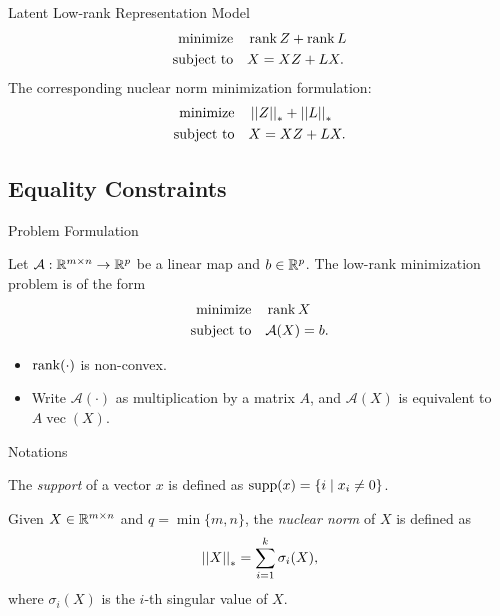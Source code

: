 \documentclass{beamer}
\begin{document}
\begin{frame}{Latent Low-rank Representation Model}
    \[\begin{aligned}
        \textnormal{minimize}\quad & \operatorname{rank} Z+\operatorname{rank} L\\
        \textnormal{subject to}\quad & X=XZ+LX.
    \end{aligned}\]
    \pause
    The corresponding nuclear norm minimization formulation:
    \[\begin{aligned}
        \textnormal{minimize}\quad & \left|\left|Z\right|\right|_\ast+\left|\left|L\right|\right|_\ast\\
        \textnormal{subject to}\quad & X=XZ+LX.
    \end{aligned}\]
\end{frame}

\subsection{Equality Constraints}

\begin{frame}{Problem Formulation}
    \begin{definition}
        Let \(\mathcal A:\mathbb R^{m\times n}\to\mathbb R^p\) be a linear map and \(b\in\mathbb R^p\). The low-rank minimization problem is of the form
        \[\begin{aligned}
            \textnormal{minimize}\quad & \operatorname{rank} X\\
            \textnormal{subject to}\quad & \mathcal A(X)=b.
        \end{aligned}\]
    \end{definition}
    \pause
    \begin{itemize}
        \item \(\operatorname{rank}(\cdot)\) is non-convex.
        \item Write \(\mathcal A(\cdot)\) as multiplication by a matrix \(A\), and \(\mathcal A(X)\) is equivalent to \(A\operatorname{vec}(X)\).
    \end{itemize}
\end{frame}

\begin{frame}{Notations}
    \begin{definition}[Support]
        The \emph{support} of a vector \(x\) is defined as \(\operatorname{supp}(x)=\left\{i\mid x_i\neq 0\right\}\).
    \end{definition}
    \begin{definition}
        Given \(X\in\mathbb R^{m\times n}\) and \(q=\min\{m,n\}\), the \emph{nuclear norm} of \(X\) is defined as
        \[\left|\left|X\right|\right|_\ast=\sum_{i=1}^k\sigma_i(X),\]
        where \(\sigma_i(X)\) is the \(i\)-th singular value of \(X\).
    \end{definition}
\end{frame}
\end{document}

